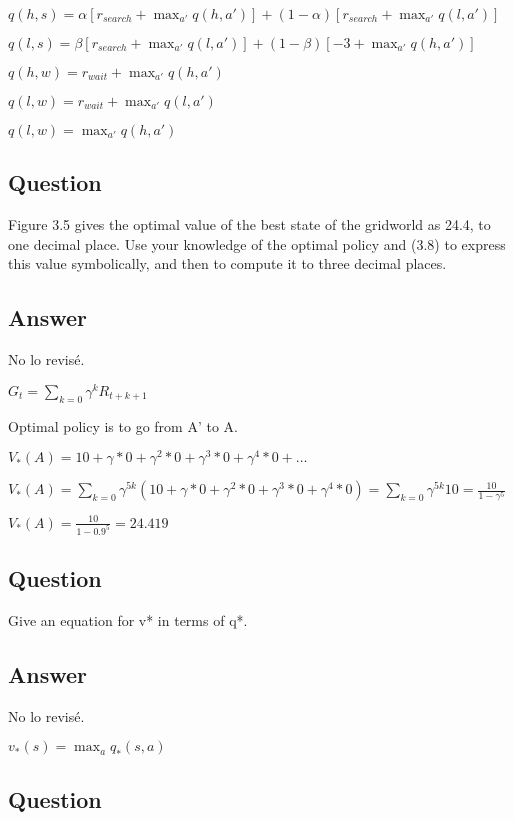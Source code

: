 \documentclass[11pt]{article}
\def\red{\color{red}}
\begin{document}
    $ q(h, s) = \alpha [r_{search} + \max_{a'} q(h,a')] + (1-\alpha) [r_{search} + \max_{a'} q(l,a') ]  $

    $ q(l, s) = \beta [r_{search} + \max_{a'} q(l,a')] + (1-\beta) [-3 + \max_{a'} q(h,a') ]  $

    $ q(h, w) = r_{wait} + \max_{a'} q(h,a') $

    $ q(l, w) = r_{wait} + \max_{a'} q(l,a') $

    $ q(l, w) = \max_{a'} q(h,a') $

    \subsection{Question}

    Figure 3.5 gives the optimal value of the best state of the gridworld as 24.4, to one decimal place.
    Use your knowledge of the optimal policy and (3.8) to express this value symbolically, and then to compute it to three decimal places.

    \subsection*{Answer}
    {\red No lo revisé.}

    $G_{t} = \sum_{k=0} \gamma ^ {k} R_{t+k+1} $

    Optimal policy is to go from A' to A.

    $V_{*}(A) = 10 + \gamma*0 + \gamma^{2}*0 + \gamma^{3}*0 + \gamma^{4}*0 + \dots $

    $V_{*}(A) = \sum_{k=0} \gamma^{5k} (10 + \gamma*0 + \gamma^{2}*0 + \gamma^{3}*0 + \gamma^{4}*0) = \sum_{k=0} \gamma^{5k} 10 = \frac{10}{1-\gamma^5}$

    $V_{*}(A) = \frac{10}{1-0.9^5} = 24.419 $

    \subsection{Question}

    Give an equation for v* in terms of q*.

    \subsection*{Answer}
    {\red No lo revisé.}

    $ v_{*}(s) = \max_{a} q_{*}(s,a) $

    \subsection{Question}
\end{document}
